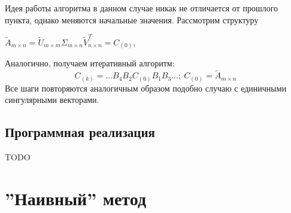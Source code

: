 Идея работы алгоритма в данном случае никак не отличается от прошлого пункта, однако меняются начальные значения. Рассмотрим структуру 
\begin{center}
    $\tilde{A}_{m \times n} = \tilde{U}_{m\times m}\Sigma_{m\times n}\tilde{V}^T_{n \times n} = C_{(0)}$,
\end{center}
Аналогично, получаем итеративный алгоритм:
\begin{equation}
    C_{(k)}=...B_4B_2C_{(0)}B_1B_3...;\ C_{(0)} = \tilde{A}_{m \times n}
\end{equation}
Все шаги повторяются аналогичным образом подобно случаю с единичными сингулярными векторами.

\subsection{Программная реализация}

TODO






\newpage
\section{''Наивный'' метод}


